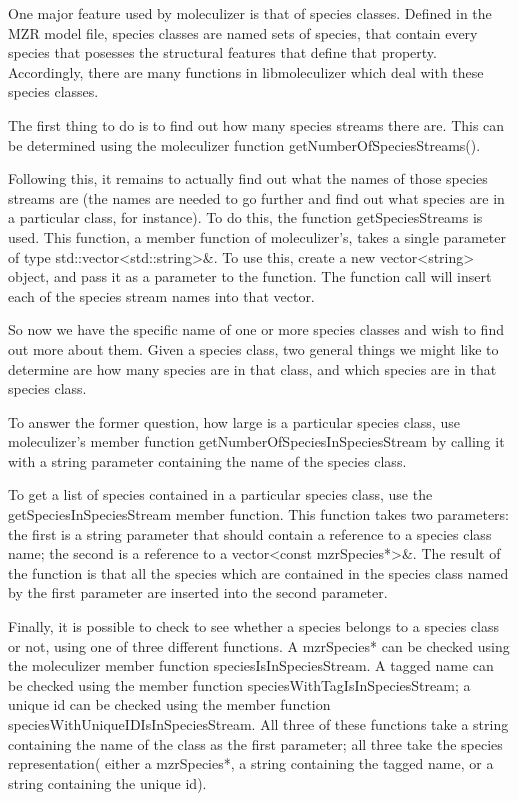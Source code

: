 One major feature used by moleculizer is that of species classes.
Defined in the MZR model file, species classes are named sets of
species, that contain every species that posesses the structural
features that define that property.  Accordingly, there are many
functions in libmoleculizer which deal with these species classes.  

The first thing to do is to find out how many species streams there
are.  This can be determined using the moleculizer function
getNumberOfSpeciesStreams().  

Following this, it remains to actually find out what the names of
those species streams are (the names are needed to go further and find
out what species are in a particular class, for instance).  To do
this, the function getSpeciesStreams is used.  This function, a member
function of moleculizer's, takes a single parameter of type
std::vector<std::string>\&.  To use this, create a new vector<string>
object, and pass it as a parameter to the function.  The function call
will insert each of the species stream names into that vector.

So now we have the specific name of one or more species classes and
wish to find out more about them.  Given a species class, two general
things we might like to determine are how many species are in that
class, and which species are in that species class. 

To answer the former question, how large is a particular species
class, use moleculizer's member function
getNumberOfSpeciesInSpeciesStream by calling it with a string
parameter containing the name of the species class.  

To get a list of species contained in a particular species class, use
the getSpeciesInSpeciesStream member function.  This function takes
two parameters: the first is a string parameter that should contain a
reference to a species class name; the second is a reference to a
vector<const mzrSpecies*>\&.  The result of the function is that all
the species which are contained in the species class named by the
first parameter are inserted into the second parameter.  

Finally, it is possible to check to see whether a species belongs to a
species class or not, using one of three different functions.  A
mzrSpecies* can be checked using the moleculizer member function
speciesIsInSpeciesStream.  A tagged name can be checked using the
member function speciesWithTagIsInSpeciesStream; a unique id can be
checked using the member function
speciesWithUniqueIDIsInSpeciesStream.  All three of these functions
take a string containing the name of the class as the first parameter;
all three take the species representation( either a mzrSpecies*, a
string containing the tagged name, or a string containing the unique
id).

